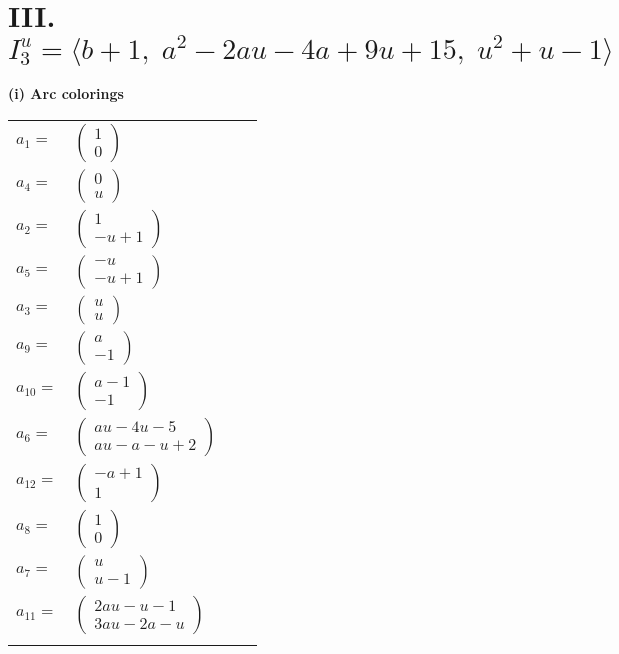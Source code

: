 \documentclass[1p]{elsarticle_modified}
\theoremstyle{definition}
\begin{document}
\centering \section*{III. $I^u_{3}= \langle b+1,\;a^2-2 a u-4 a+9 u+15,\;u^2+u-1 \rangle$}
\flushleft \textbf{(i) Arc colorings}\\
\begin{tabular}{m{7pt} m{180pt} m{7pt} m{180pt} }
\flushright $a_{1}=$&$\begin{pmatrix}1\\0\end{pmatrix}$ \\
\flushright $a_{4}=$&$\begin{pmatrix}0\\u\end{pmatrix}$ \\
\flushright $a_{2}=$&$\begin{pmatrix}1\\- u+1\end{pmatrix}$ \\
\flushright $a_{5}=$&$\begin{pmatrix}- u\\- u+1\end{pmatrix}$ \\
\flushright $a_{3}=$&$\begin{pmatrix}u\\u\end{pmatrix}$ \\
\flushright $a_{9}=$&$\begin{pmatrix}a\\-1\end{pmatrix}$ \\
\flushright $a_{10}=$&$\begin{pmatrix}a-1\\-1\end{pmatrix}$ \\
\flushright $a_{6}=$&$\begin{pmatrix}a u-4 u-5\\a u- a- u+2\end{pmatrix}$ \\
\flushright $a_{12}=$&$\begin{pmatrix}- a+1\\1\end{pmatrix}$ \\
\flushright $a_{8}=$&$\begin{pmatrix}1\\0\end{pmatrix}$ \\
\flushright $a_{7}=$&$\begin{pmatrix}u\\u-1\end{pmatrix}$ \\
\flushright $a_{11}=$&$\begin{pmatrix}2 a u- u-1\\3 a u-2 a- u\end{pmatrix}$\\&\end{tabular}
\end{document}
